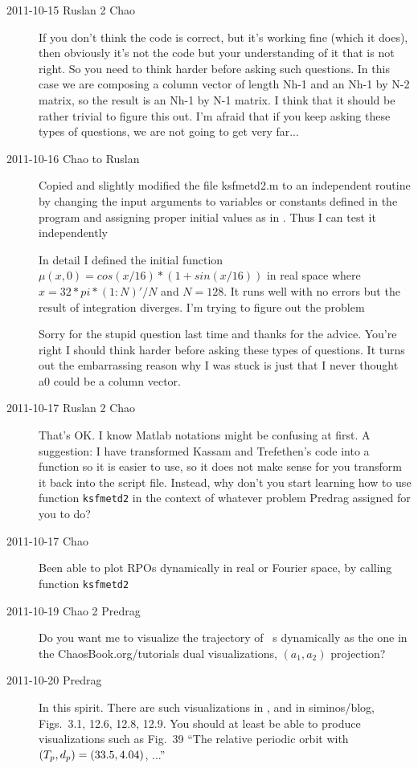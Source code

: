 \begin{description}
\item[2011-10-15 Ruslan 2 Chao]
If you don't think the code is correct, but it's working fine (which it does), then obviously it's not the code but your understanding of it that is not right.  So you need to think harder before asking such questions.  In this case we are composing a column vector of length Nh-1 and an Nh-1 by N-2 matrix, so the result is an Nh-1 by N-1 matrix.  I think that it should be rather trivial to figure this out.  I'm afraid that if you keep asking these types of questions, we are not going to get very far...

\item[2011-10-16 Chao to Ruslan]
Copied and slightly modified the file ksfmetd2.m to an independent routine by changing the input arguments to variables or constants defined in the program and assigning proper initial values as in . Thus I can test it independently

In detail I defined the initial function $\mu(x,0)=cos(x/16)*(1+sin(x/16))$ in real space where $x = 32*pi*(1:N)'/N$ and $N =128$.  It runs well with no errors but the result of integration diverges. I'm trying to figure out the problem

Sorry for the stupid question last time and thanks for the advice. You're right I should think harder before asking these types of questions. It turns out the embarrassing reason why I was stuck is just that I never thought a0 could be a column vector.

\item[2011-10-17 Ruslan 2 Chao]
That's OK.  I know Matlab notations might be confusing at first.  A suggestion: I have transformed Kassam and Trefethen's code into a function so it is easier to use, so it does not make sense for you transform it back into the script file.  Instead, why don't you start learning how to use function \texttt{ksfmetd2} in the context of whatever problem Predrag assigned for you to do?

\item[2011-10-17 Chao] Been able to plot RPOs dynamically in real or Fourier space, by calling function \texttt{ksfmetd2}

\item[2011-10-19 Chao 2 Predrag] Do you want me to visualize the
trajectory of \KS\ \rpo s dynamically as the one in the
ChaosBook.org/\-tutorials dual visualizations, $(a_1,a_2)$
projection?

\item[2011-10-20 Predrag] In this spirit. There are such visualizations
in , and in siminos/blog,
Figs.~3.1, 12.6, 12.8, 12.9. You should at least be able to
produce visualizations such as Fig.~39 ``The relative periodic orbit with $({T_{p}}, d_p) = (33.5, 4.04)$,
...''

\end{description}
